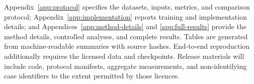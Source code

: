 Appendix~\ref{app:protocol} specifies the datasets, inputs, metrics, and
comparison protocol; Appendix~\ref{app:implementation} reports training and
implementation details; and Appendices~\ref{app:method-details} and
\ref{app:full-results} provide the method details, controlled analyses, and
complete results. Tables are generated from machine-readable summaries with
source hashes. End-to-end reproduction additionally requires the licensed data
and checkpoints. Release materials will include code, protocol manifests,
aggregate measurements, and non-identifying case identifiers to the extent
permitted by those licences.
